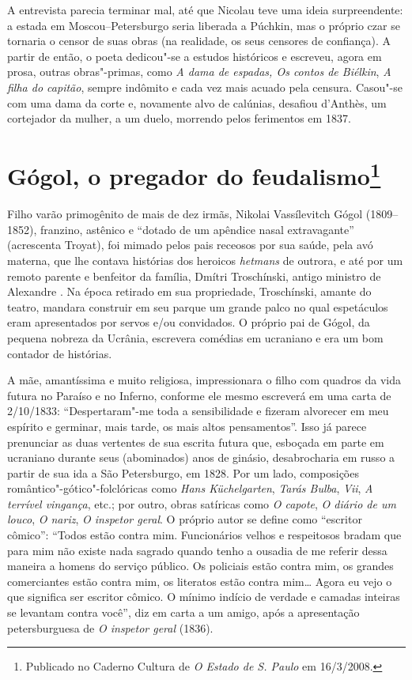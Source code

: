 A entrevista parecia terminar mal, até que Nicolau teve uma ideia
surpreendente: a estada em Moscou--Petersburgo seria liberada a Púchkin,
mas o próprio czar se tornaria o censor de suas obras (na realidade, os seus censores de confiança). A partir de então, o poeta dedicou"-se a
estudos históricos e escreveu, agora em prosa, outras obras"-primas,
como \emph{A dama de espadas, Os contos de Biélkin}, \emph{A filha do
capitão}, sempre indômito e cada vez mais acuado pela censura. Casou"-se com uma dama da corte e, novamente alvo de calúnias, desafiou d'Anthès, um cortejador da mulher, a um duelo, morrendo pelos ferimentos em 1837.



\chapter{Gógol, o pregador do feudalismo\footnote{Publicado no Caderno Cultura de \emph{O Estado de S. Paulo} em 16/3/2008.}}

Filho varão primogênito de mais de dez irmãs, Nikolai Vassílevitch
Gógol (1809--1852), franzino, astênico e ``dotado de um apêndice nasal
extravagante'' (acrescenta Troyat), foi mimado pelos pais receosos por sua saúde, pela avó materna, que lhe contava histórias dos heroicos \emph{hetmans} de outrora, e até por um remoto parente e benfeitor da família, Dmítri Troschínski, antigo ministro de Alexandre . Na época retirado em sua propriedade, Troschínski, amante do teatro, mandara construir em seu parque um grande palco no qual espetáculos eram apresentados por servos e/ou convidados. O próprio pai de Gógol, da pequena nobreza da Ucrânia, escrevera comédias em ucraniano e era um bom contador de histórias.

A mãe, amantíssima e muito religiosa, impressionara o filho com quadros da vida futura no Paraíso e no Inferno, conforme ele mesmo escreverá em uma carta de 2/10/1833: ``Despertaram"-me toda a sensibilidade e fizeram alvorecer em meu espírito e germinar, mais tarde, os mais altos pensamentos''. Isso já parece prenunciar as duas vertentes de sua escrita futura que, esboçada em parte em ucraniano durante seus (abominados) anos de ginásio, desabrocharia em russo a partir de sua ida a São Petersburgo, em 1828. Por um lado, composições romântico"-gótico"-folclóricas como \emph{Hans Küchelgarten}, \emph{Tarás Bulba}, \emph{Vii}, \emph{A terrível vingança}, etc.; por outro, obras satíricas como \emph{O capote}, \emph{O diário de um louco}, \emph{O nariz}, \emph{O inspetor geral}. O próprio autor se define como ``escritor cômico'': ``Todos estão contra mim. Funcionários velhos e respeitosos bradam que para mim não existe nada sagrado quando tenho a ousadia de me referir dessa maneira a homens do serviço público. Os policiais estão contra mim, os grandes comerciantes estão contra mim, os literatos estão contra mim\ldots{} Agora eu vejo o que significa ser escritor cômico. O mínimo indício de verdade e camadas inteiras se levantam contra você'', diz em
carta a um amigo, após a apresentação petersburguesa de \emph{O inspetor geral} (1836).

